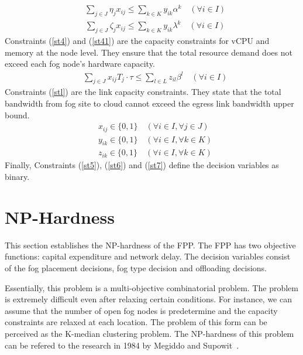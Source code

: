 \documentclass[10pt,journal,compsoc]{IEEEtran}
\newcommand{\Eq}[1]{(\ref{#1})}
\begin{document}
\begin{align}
&\sum_{j\in J} \eta_j x_{ij} \leq \sum_{k\in K} y_{ik}\alpha^k \quad(\forall i \in I)\label{st4}
\end{align}
\begin{align}
&\sum_{j\in J} \zeta_j x_{ij} \leq \sum_{k\in K} y_{ik}\lambda^k \quad(\forall i \in I)\label{st41}
\end{align}
Constraints \Eq{st4} and \Eq{st41} are the capacity constraints for vCPU and memory at the node level. They ensure that the total resource demand does not exceed each fog node's hardware capacity. 
\begin{align}
&\sum_{j\in J} x_{ij} T_j \cdot \tau \leq \sum_{l\in L} z_{il} \beta^l\quad(\forall i \in I) \label{stl}
\end{align}
Constraints \Eq{stl} are the link capacity constraints. They state that the total bandwidth from fog site to cloud cannot exceed the egress link bandwidth upper bound.\\
\begin{align}
&x_{ij} \in \{0,1\} \quad (\forall i \in I, \forall j \in J)\label{st5}\\
& y_{ik} \in \{0,1\} \quad (\forall i \in I, \forall k \in K)\label{st6}\\
& z_{ik} \in \{0,1\} \quad (\forall i \in I, \forall k \in K)\label{st7}
\end{align}
Finally, Constraints \Eq{st5}, \Eq{st6} and \Eq{st7} define the decision variables as binary.

\section{NP-Hardness}\label{nphard}
This section establishes the NP-hardness of the FPP.
The FPP has two objective functions: capital expenditure and network delay. The decision variables consist of the fog placement decisions, fog type decision and offloading decisions. %

Essentially, this problem is a multi-objective combinatorial problem. The problem is extremely difficult even after relaxing certain conditions. For instance, we can assume that the number of open fog nodes is predetermine and the capacity constraints are relaxed at each location. The problem of this form can be perceived as the K-median clustering problem. The NP-hardness of this problem can be refered to the research in 1984 by Megiddo and Supowit~\cite{1984}.
\end{document}
